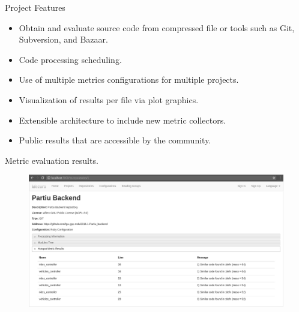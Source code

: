 \begin{block}{Project Features}
    \begin{itemize}
        \item Obtain and evaluate source code from compressed file or
            tools such as Git, Subversion, and Bazaar.
        \item Code processing scheduling.
        \item Use of multiple metrics configurations for multiple
            projects.
        \item Visualization of results per file via plot graphics.
        \item Extensible architecture to include new metric collectors.
        \item Public results that are accessible by the community.
    \end{itemize}
\end{block}

\begin{block}{Metric evaluation results.}
    \begin{figure}
        \begin{center}
            \includegraphics[width=\textwidth]{figures/MetricProcessing.png}
                \label{fig:feature1}
        \end{center}
    \end{figure}
\end{block}

